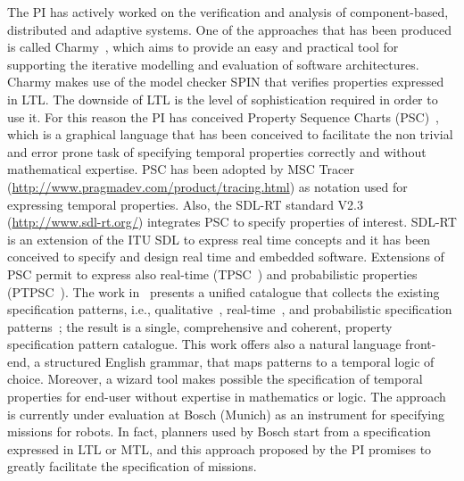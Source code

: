 \documentclass[12pt]{article}
\begin{document}
The PI has actively worked on the verification and analysis of %
component-based, distributed and adaptive systems. 
One of the approaches that has been produced is called Charmy~\cite{Pelliccione2009}, which aims to provide an easy and practical tool for supporting the iterative modelling and evaluation of software architectures. %
Charmy makes use of the model checker SPIN that verifies properties expressed in LTL. The downside of LTL is the level of sophistication required in order to use it. 
For this reason the PI has conceived Property Sequence Charts (PSC)~\cite{AIP07}, which is a graphical language that has been conceived to facilitate the non trivial and error prone task of specifying
temporal properties correctly and without mathematical expertise. 
PSC has been adopted by MSC Tracer ({\small \url{http://www.pragmadev.com/product/tracing.html}}) as notation used for expressing temporal properties. Also, the SDL-RT standard V2.3 ({\small \url{http://www.sdl-rt.org/}}) 
integrates PSC to specify properties of interest. SDL-RT is an extension of the ITU SDL to express real time concepts
and it has been conceived to specify and design real time and embedded software. Extensions of PSC permit to express also real-time (TPSC~\cite{TPSC}) and probabilistic properties (PTPSC~\cite{PTPSC}). 
The work in~\cite{TSE2015} presents a unified catalogue that collects the existing specification patterns, i.e., qualitative~\cite{dwyer-99}, real-time~\cite{Konrad2005}, and probabilistic specification patterns~\cite{Grunske2008}; %
the result is a single, comprehensive and coherent, property specification
pattern catalogue. This work offers also a natural language front-end, a structured English grammar, that maps patterns to a temporal logic of choice.
Moreover, a wizard tool makes possible the specification of temporal properties for end-user without expertise in mathematics or logic. The approach is currently under evaluation at Bosch (Munich) as an instrument for specifying missions for robots. In fact, planners used by Bosch start from a specification expressed in LTL or MTL, and this approach proposed by the PI promises to greatly facilitate the specification of missions. 
\end{document}
